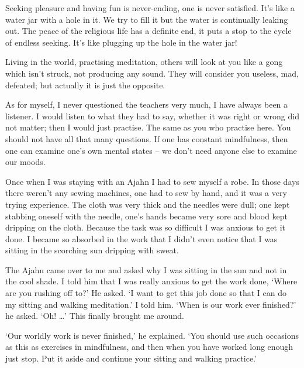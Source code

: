 Seeking pleasure and having fun is never-ending, one is never satisfied. It's like a water jar with a hole in it. We try to fill it but the water is continually leaking out. The peace of the religious life has a definite end, it puts a stop to the cycle of endless seeking. It's like plugging up the hole in the water jar!

Living in the world, practising meditation, others will look at you like a gong which isn't struck, not producing any sound. They will consider you useless, mad, defeated; but actually it is just the opposite.

As for myself, I never questioned the teachers very much, I have always been a listener. I would listen to what they had to say, whether it was right or wrong did not matter; then I would just practise. The same as you who practise here. You should not have all that many questions. If one has constant mindfulness, then one can examine one's own mental states -- we don't need anyone else to examine our moods.

Once when I was staying with an Ajahn I had to sew myself a robe. In those days there weren't any sewing machines, one had to sew by hand, and it was a very trying experience. The cloth was very thick and the needles were dull; one kept stabbing oneself with the needle, one's hands became very sore and blood kept dripping on the cloth. Because the task was so difficult I was anxious to get it done. I became so absorbed in the work that I didn't even notice that I was sitting in the scorching sun dripping with sweat.

The Ajahn came over to me and asked why I was sitting in the sun and not in the cool shade. I told him that I was really anxious to get the work done, `Where are you rushing off to?' He asked. `I want to get this job done so that I can do my sitting and walking meditation.' I told him. `When is our work ever finished?' he asked. `Oh! \ldots{}' This finally brought me around.

`Our worldly work is never finished,' he explained. `You should use such occasions as this as exercises in mindfulness, and then when you have worked long enough just stop. Put it aside and continue your sitting and walking practice.'

